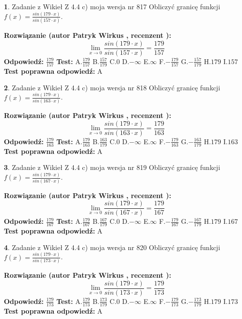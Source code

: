 \documentclass[12pt, a4paper]{article}
\theoremstyle{definition} %
\newtheorem{zad}{}
\newcommand{\zadStart}[1]{\begin{zad}#1\newline}
\newcommand{\zadStop}{\end{zad}}
\newcommand{\rozwStart}[2]{\noindent \textbf{Rozwiązanie (autor #1 , recenzent #2): }\newline}
\newcommand{\rozwStop}{\newline}
\newcommand{\odpStart}{\noindent \textbf{Odpowiedź:}\newline}
\newcommand{\odpStop}{\newline}
\newcommand{\testStart}{\noindent \textbf{Test:}\newline}
\newcommand{\testStop}{\newline}
\newcommand{\kluczStart}{\noindent \textbf{Test poprawna odpowiedź:}\newline}
\newcommand{\kluczStop}{\newline}
\begin{document}
\zadStart{Zadanie z Wikieł Z 4.4 c) moja wersja nr 817}
Obliczyć granicę funkcji $f(x)=\frac{sin(179\cdot x)}{sin(157\cdot x)}$.
\zadStop
\rozwStart{Patryk Wirkus}{}
$$\lim\limits_{x\to 0}\frac{sin(179\cdot x)}{sin(157\cdot x)}=
\frac{179}{157}$$
\rozwStop
\odpStart
$\frac{179}{157}$
\odpStop
\testStart
A.$\frac{179}{157}$
B.$\frac{157}{179}$
C.$0$
D.$-\infty$
E.$\infty$
F.$-\frac{179}{157}$
G.$-\frac{157}{179}$
H.$179$
I.$157$
\testStop
\kluczStart
A
\kluczStop



\zadStart{Zadanie z Wikieł Z 4.4 c) moja wersja nr 818}
Obliczyć granicę funkcji $f(x)=\frac{sin(179\cdot x)}{sin(163\cdot x)}$.
\zadStop
\rozwStart{Patryk Wirkus}{}
$$\lim\limits_{x\to 0}\frac{sin(179\cdot x)}{sin(163\cdot x)}=
\frac{179}{163}$$
\rozwStop
\odpStart
$\frac{179}{163}$
\odpStop
\testStart
A.$\frac{179}{163}$
B.$\frac{163}{179}$
C.$0$
D.$-\infty$
E.$\infty$
F.$-\frac{179}{163}$
G.$-\frac{163}{179}$
H.$179$
I.$163$
\testStop
\kluczStart
A
\kluczStop



\zadStart{Zadanie z Wikieł Z 4.4 c) moja wersja nr 819}
Obliczyć granicę funkcji $f(x)=\frac{sin(179\cdot x)}{sin(167\cdot x)}$.
\zadStop
\rozwStart{Patryk Wirkus}{}
$$\lim\limits_{x\to 0}\frac{sin(179\cdot x)}{sin(167\cdot x)}=
\frac{179}{167}$$
\rozwStop
\odpStart
$\frac{179}{167}$
\odpStop
\testStart
A.$\frac{179}{167}$
B.$\frac{167}{179}$
C.$0$
D.$-\infty$
E.$\infty$
F.$-\frac{179}{167}$
G.$-\frac{167}{179}$
H.$179$
I.$167$
\testStop
\kluczStart
A
\kluczStop



\zadStart{Zadanie z Wikieł Z 4.4 c) moja wersja nr 820}
Obliczyć granicę funkcji $f(x)=\frac{sin(179\cdot x)}{sin(173\cdot x)}$.
\zadStop
\rozwStart{Patryk Wirkus}{}
$$\lim\limits_{x\to 0}\frac{sin(179\cdot x)}{sin(173\cdot x)}=
\frac{179}{173}$$
\rozwStop
\odpStart
$\frac{179}{173}$
\odpStop
\testStart
A.$\frac{179}{173}$
B.$\frac{173}{179}$
C.$0$
D.$-\infty$
E.$\infty$
F.$-\frac{179}{173}$
G.$-\frac{173}{179}$
H.$179$
I.$173$
\testStop
\kluczStart
A
\kluczStop
\end{document}
